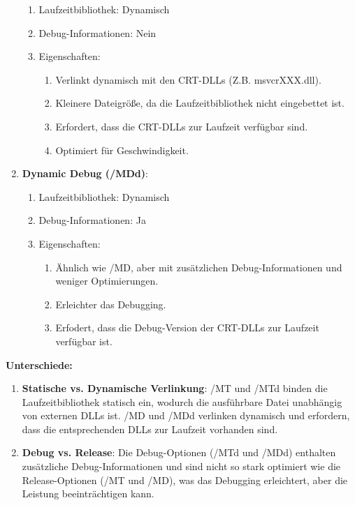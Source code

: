 \documentclass{article}
\begin{document}
\begin{enumerate}
		\begin{enumerate}
			\item Laufzeitbibliothek: Dynamisch
			\item Debug-Informationen: Nein
			\item Eigenschaften:
			\begin{enumerate}
				\item Verlinkt dynamisch mit den CRT-DLLs (Z.B. msvcrXXX.dll).
				\item Kleinere Dateigröße, da die Laufzeitbibliothek nicht eingebettet ist.
				\item Erfordert, dass die CRT-DLLs zur Laufzeit verfügbar sind.
				\item Optimiert für Geschwindigkeit.
			\end{enumerate}
		\end{enumerate}
		\item \textbf{Dynamic Debug (/MDd)}:
		\begin{enumerate}
			\item Laufzeitbibliothek: Dynamisch
			\item Debug-Informationen: Ja
			\item Eigenschaften:
			\begin{enumerate}
				\item Ähnlich wie /MD, aber mit zusätzlichen Debug-Informationen und weniger Optimierungen.
				\item Erleichter das Debugging.
				\item Erfodert, dass die Debug-Version der CRT-DLLs zur Laufzeit verfügbar ist.
			\end{enumerate}
		\end{enumerate}
	\end{enumerate}
	
	\pagebreak
	
	\textbf{Unterschiede:}\\
	\begin{enumerate}
		\item \textbf{Statische vs. Dynamische Verlinkung}: /MT und /MTd binden die Laufzeitbibliothek statisch ein, wodurch die ausführbare Datei unabhängig von externen DLLs ist. /MD und /MDd verlinken dynamisch und erfordern, dass die entsprechenden DLLs zur Laufzeit vorhanden sind.
		\item \textbf{Debug vs. Release}: Die Debug-Optionen (/MTd und /MDd) enthalten zusätzliche Debug-Informationen und sind nicht so stark optimiert wie die Release-Optionen (/MT und /MD), was das Debugging erleichtert, aber die Leistung beeinträchtigen kann. 
	\end{enumerate}
	
\end{document}
